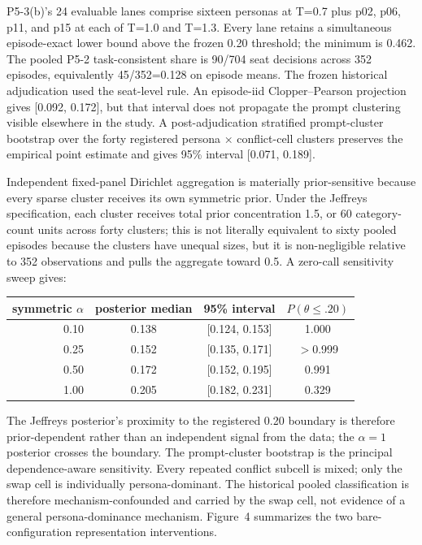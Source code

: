 \documentclass[
  11pt]{article}
\begin{document}
P5-3(b)'s 24 evaluable lanes comprise sixteen personas at T=0.7 plus
p02, p06, p11, and p15 at each of T=1.0 and T=1.3. Every lane retains a
simultaneous episode-exact lower bound above the frozen 0.20 threshold;
the minimum is 0.462. The pooled P5-2 task-consistent share is 90/704
seat decisions across 352 episodes, equivalently 45/352=0.128 on episode
means. The frozen historical adjudication used the seat-level rule. An
episode-iid Clopper--Pearson projection gives {[}0.092, 0.172{]}, but
that interval does not propagate the prompt clustering visible elsewhere
in the study. A post-adjudication stratified prompt-cluster bootstrap over
the forty registered persona × conflict-cell clusters preserves the
empirical point estimate and gives 95\% interval {[}0.071, 0.189{]}.

Independent fixed-panel Dirichlet aggregation is materially
prior-sensitive because every sparse cluster receives its own symmetric
prior. Under the Jeffreys specification, each cluster receives total prior
concentration 1.5, or 60 category-count units across forty clusters; this
is not literally equivalent to sixty pooled episodes because the clusters
have unequal sizes, but it is non-negligible relative to 352 observations
and pulls the aggregate toward 0.5. A zero-call sensitivity sweep gives:

\begin{center}
\begin{tabular}{rccc}
\toprule
symmetric $\alpha$ & posterior median & 95\% interval & $P(\theta\le .20)$ \\
\midrule
0.10 & 0.138 & {[}0.124, 0.153{]} & 1.000 \\
0.25 & 0.152 & {[}0.135, 0.171{]} & $>$0.999 \\
0.50 & 0.172 & {[}0.152, 0.195{]} & 0.991 \\
1.00 & 0.205 & {[}0.182, 0.231{]} & 0.329 \\
\bottomrule
\end{tabular}
\end{center}

The Jeffreys posterior's proximity to the registered 0.20 boundary is
therefore prior-dependent rather than an independent signal from the data;
the $\alpha=1$ posterior crosses the boundary. The prompt-cluster
bootstrap is the principal dependence-aware sensitivity. Every repeated
conflict subcell is mixed; only the swap cell is individually
persona-dominant. The historical pooled classification is therefore
mechanism-confounded and carried by the swap cell, not evidence of a
general persona-dominance mechanism. Figure~4 summarizes the two
bare-configuration representation interventions.
\end{document}
